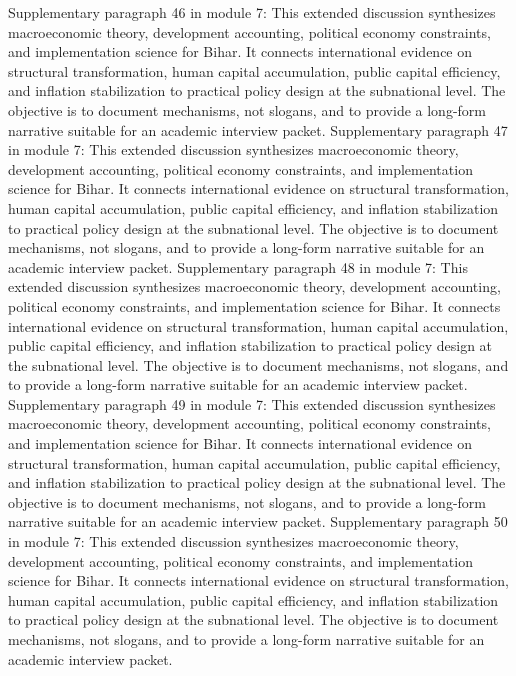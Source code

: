 \documentclass[preprint,12pt]{elsarticle}
\begin{document}
Supplementary paragraph 46 in module 7: This extended discussion synthesizes macroeconomic theory, development accounting, political economy constraints, and implementation science for Bihar. It connects international evidence on structural transformation, human capital accumulation, public capital efficiency, and inflation stabilization to practical policy design at the subnational level. The objective is to document mechanisms, not slogans, and to provide a long-form narrative suitable for an academic interview packet.
Supplementary paragraph 47 in module 7: This extended discussion synthesizes macroeconomic theory, development accounting, political economy constraints, and implementation science for Bihar. It connects international evidence on structural transformation, human capital accumulation, public capital efficiency, and inflation stabilization to practical policy design at the subnational level. The objective is to document mechanisms, not slogans, and to provide a long-form narrative suitable for an academic interview packet.
Supplementary paragraph 48 in module 7: This extended discussion synthesizes macroeconomic theory, development accounting, political economy constraints, and implementation science for Bihar. It connects international evidence on structural transformation, human capital accumulation, public capital efficiency, and inflation stabilization to practical policy design at the subnational level. The objective is to document mechanisms, not slogans, and to provide a long-form narrative suitable for an academic interview packet.
Supplementary paragraph 49 in module 7: This extended discussion synthesizes macroeconomic theory, development accounting, political economy constraints, and implementation science for Bihar. It connects international evidence on structural transformation, human capital accumulation, public capital efficiency, and inflation stabilization to practical policy design at the subnational level. The objective is to document mechanisms, not slogans, and to provide a long-form narrative suitable for an academic interview packet.
Supplementary paragraph 50 in module 7: This extended discussion synthesizes macroeconomic theory, development accounting, political economy constraints, and implementation science for Bihar. It connects international evidence on structural transformation, human capital accumulation, public capital efficiency, and inflation stabilization to practical policy design at the subnational level. The objective is to document mechanisms, not slogans, and to provide a long-form narrative suitable for an academic interview packet.
\end{document}
